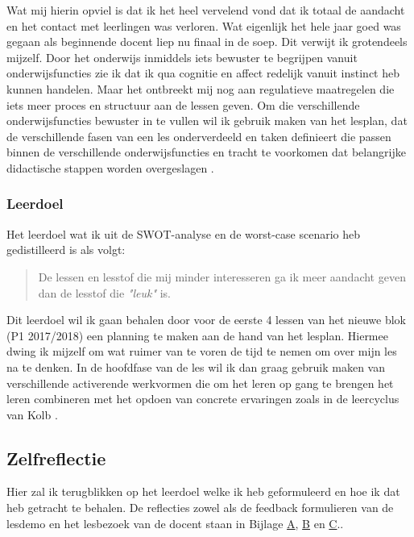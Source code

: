 Wat mij hierin opviel is dat ik het heel vervelend vond dat ik totaal de aandacht en het contact met leerlingen was verloren. Wat eigenlijk het hele jaar goed was gegaan als beginnende docent liep nu finaal in de soep. Dit verwijt ik grotendeels mijzelf. Door het onderwijs inmiddels iets bewuster te begrijpen vanuit onderwijsfuncties \cite[p.45-62]{kallenberg2014leren} zie ik dat ik qua cognitie en affect redelijk vanuit instinct heb kunnen handelen. Maar het ontbreekt mij nog aan regulatieve maatregelen die iets meer proces en structuur aan de lessen geven. Om die verschillende onderwijsfuncties bewuster in te vullen wil ik gebruik maken van het lesplan, dat de verschillende fasen van een les onderverdeeld en taken definieert die passen binnen de verschillende onderwijsfuncties en tracht te voorkomen dat belangrijke didactische stappen worden overgeslagen \cite[p.163-169]{bijkerk2015activerend}.

\subsubsection{Leerdoel}
Het leerdoel wat ik uit de SWOT-analyse en de worst-case scenario heb gedistilleerd is als volgt:
\begin{quote}
  De lessen en lesstof die mij minder interesseren ga ik meer aandacht geven dan de lesstof die \textit{"leuk"} is.
\end{quote}

Dit leerdoel wil ik gaan behalen door voor de eerste 4 lessen van het nieuwe blok (P1 2017/2018) een planning te maken aan de hand van het lesplan. Hiermee dwing ik mijzelf om wat ruimer van te voren de tijd te nemen om over mijn les na te denken. In de hoofdfase van de les wil ik dan graag gebruik maken van verschillende activerende werkvormen die om het leren op gang te brengen het leren combineren met het opdoen van concrete ervaringen zoals in de leercyclus van Kolb \cite[p.143-145]{kallenberg2014leren}. 

\subsection{Zelfreflectie}
\label{sec:Zelfreflectie}
Hier zal ik terugblikken op het leerdoel welke ik heb geformuleerd en hoe ik dat heb getracht te behalen. De reflecties zowel als de feedback formulieren van de lesdemo en het lesbezoek van de docent staan in Bijlage \hyperref[sec:lesdemo]{A}, \hyperref[sec:lesbezoek]{B} en \hyperref[sec:lesbezoekcollega]{C}..


